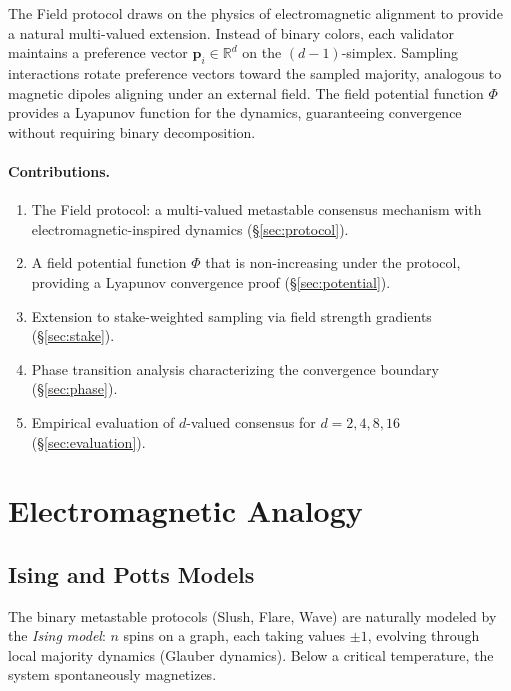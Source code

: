 \documentclass[11pt,a4paper]{article}
\begin{document}
The Field protocol draws on the physics of electromagnetic alignment to provide a natural
multi-valued extension. Instead of binary colors, each validator maintains a preference
vector $\mathbf{p}_i \in \mathbb{R}^d$ on the $(d-1)$-simplex. Sampling interactions
rotate preference vectors toward the sampled majority, analogous to magnetic dipoles
aligning under an external field. The field potential function $\Phi$ provides a
Lyapunov function for the dynamics, guaranteeing convergence without requiring
binary decomposition.

\paragraph{Contributions.}
\begin{enumerate}[nosep]
\item The Field protocol: a multi-valued metastable consensus mechanism with
electromagnetic-inspired dynamics (\S\ref{sec:protocol}).
\item A field potential function $\Phi$ that is non-increasing under the protocol,
providing a Lyapunov convergence proof (\S\ref{sec:potential}).
\item Extension to stake-weighted sampling via field strength gradients (\S\ref{sec:stake}).
\item Phase transition analysis characterizing the convergence boundary (\S\ref{sec:phase}).
\item Empirical evaluation of $d$-valued consensus for $d = 2, 4, 8, 16$ (\S\ref{sec:evaluation}).
\end{enumerate}

\section{Electromagnetic Analogy}
\label{sec:analogy}

\subsection{Ising and Potts Models}

The binary metastable protocols (Slush, Flare, Wave) are naturally modeled by the
\emph{Ising model}: $n$ spins on a graph, each taking values $\pm 1$, evolving through
local majority dynamics (Glauber dynamics). Below a critical temperature, the system
spontaneously magnetizes.
\end{document}
